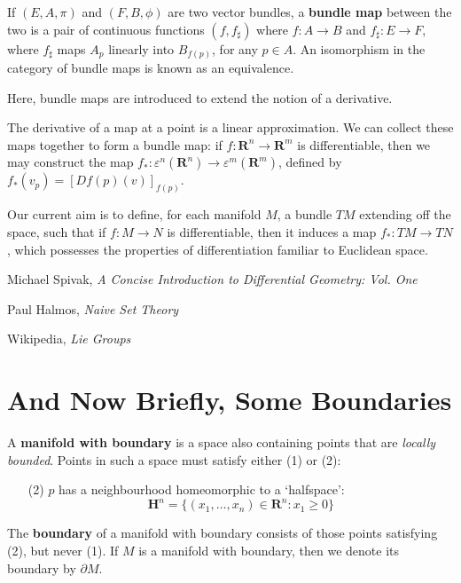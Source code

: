 \begin{definition}
    If $(E,A,\pi)$ and $(F,B,\phi)$ are two vector bundles, a {\bf bundle map} between the two is a pair of continuous functions $(f,f_\sharp)$ where $f:A \to B$ and $f_\sharp:E \to F$, where $f_\sharp$ maps $A_p$ linearly into $B_{f(p)}$, for any $p \in A$. An isomorphism in the category of bundle maps is known as an equivalence.
\end{definition}

Here, bundle maps are introduced to extend the notion of a derivative.

\begin{example}
    The derivative of a map at a point is a linear approximation. We can collect these maps together to form a bundle map: if $f:\mathbf{R}^n \to \mathbf{R}^m$ is differentiable, then we may construct the map $f_*:\varepsilon^n(\mathbf{R}^n) \to \varepsilon^m(\mathbf{R}^m)$, defined by $f_*(v_p) = [Df(p)(v)]_{f(p)}$.
\end{example}

Our current aim is to define, for each manifold $M$, a bundle $TM$ extending off the space, such that if $f:M \to N$ is differentiable, then it induces a map $f_*:TM \to TN$, which possesses the properties of differentiation familiar to Euclidean space.

\begin{thebibliography}{10}
     Michael Spivak,
    \emph{A Concise Introduction to Differential Geometry: Vol. One}

     Paul Halmos,
    \emph{Naive Set Theory}

     Wikipedia,
    \emph{Lie Groups}
\end{thebibliography}




\section{And Now Briefly, Some Boundaries}

\begin{definition}
    A {\bf manifold with boundary} is a space also containing points that are {\it locally bounded}. Points in such a space must satisfy either (1) or (2):
    \begin{enumerate}
        \item[(2)] $p$ has a neighbourhood homeomorphic to a `halfspace':
        \[ \mathbf{H}^n = \{ (x_1, \dots, x_n) \in \mathbf{R}^n: x_1 \geq 0 \} \]
    \end{enumerate}
    The {\bf boundary} of a manifold with boundary consists of those points satisfying (2), but never (1). If $M$ is a manifold with boundary, then we denote its boundary by $\partial M$.
\end{definition}

